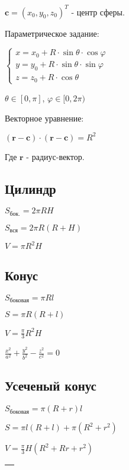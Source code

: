 $ \boldsymbol{c} = (x_0, y_0, z_0)^T $ - центр сферы.

Параметрическое задание:

$\begin{cases}
	x = x_0 + R\cdot \sin\theta \cdot \cos \varphi \\
	y = y_0 + R\cdot \sin\theta \cdot \sin \varphi \\
	z = z_0 + R\cdot \cos\theta
\end{cases} $

$ \theta \in [0, \pi] $, $ \varphi \in [0, 2\pi) $

Векторное уравнение:

$ (\boldsymbol{r} - \boldsymbol{c})\cdot (\boldsymbol{r} - \boldsymbol{c}) = R^2 $

Где $\boldsymbol{r}$ - радиус-вектор. 

\subsection{Цилиндр}

$ S_\text{бок.} = 2 \pi R H $

$ S_\text{вся} = 2 \pi R (R+H) $

$ V = \pi R^2 H $

\subsection{Конус}

$ S_{\text{боковая}} = \pi R l $

$ S = \pi R (R + l) $

$ V = \frac{\pi}{3} R^2 H $

$ \frac{x^2}{a^2} + \frac{y^2}{b^2} - \frac{z^2}{c^2} = 0 $

\subsection{Усеченый конус}

$ S_{\text{боковая}} = \pi (R+r) l $

$ S = \pi l (R + l) + \pi (R^2 + r^2) $

$ V = \frac{\pi}{3} H (R^2 + Rr + r^2) $


\begin{tabu}[t]{||c|c||}
	\hline
		 \\
	\hline
	\hline
	\hline
	\hline
	\hline
	\hline
	\hline
	\hline
\end{tabu}